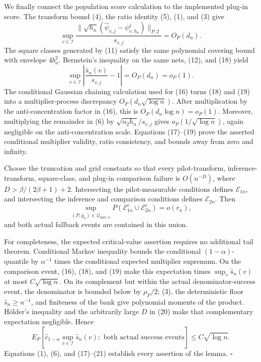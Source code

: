 We finally connect the population score calculation to the implemented plug-in score.  The transform bound (4), the ratio identity (5), (1), and (3) give
\[
 \sup_{v\in\mathcal I}
 \frac{\|\sqrt{h_n}(\widehat\psi_{v,j}-\psi^j_{v,h_n})\|_{P,2}}{s_{v,j}}
 =O_P(d_n). \tag{18}
\]
The square classes generated by (11) satisfy the same polynomial covering bound with envelope \(4b_n^2\).  Bernstein's inequality on the same nets, (12), and (18) yield
\[
 \sup_{v\in\mathcal I}\left|\frac{\widehat s_n(v)}{s_{v,j}}-1\right|=O_P(d_n)=o_P(1). \tag{19}
\]
The conditional Gaussian chaining calculation used for (16) turns (18) and (19) into a multiplier-process discrepancy \(O_P(d_n\sqrt{\log n})\).  After multiplication by the anti-concentration factor in (16), this is \(O_P(d_n\log n)=o_P(1)\).  Moreover, multiplying the remainder in (6) by \(\sqrt{n_2h_n}/s_{v,j}\) gives \(o_P(1/\sqrt{\log n})\), again negligible on the anti-concentration scale.  Equations (17)--(19) prove the asserted conditional multiplier validity, ratio consistency, and bounds away from zero and infinity.

Choose the truncation and grid constants so that every pilot-transform, inference-transform, square-class, and plug-in comparison failure is \(O(n^{-D})\), where \(D>\beta/(2\beta+1)+2\).  Intersecting the pilot-measurable conditions defines \(\mathcal E_{1n}\), and intersecting the inference and comparison conditions defines \(\mathcal E_{2n}\).  Then
\[
 \sup_{(P,\bar g_n)\in\mathcal Q_{\mathrm{spec},n}}
 P(\mathcal E_{1n}^c\cup\mathcal E_{2n}^c)=o(r_n), \tag{20}
\]
and both actual fallback events are contained in this union.

For completeness, the expected critical-value assertion requires no additional tail theorem.  Conditional Markov inequality bounds the conditional \((1-\alpha)\)-quantile by \(\alpha^{-1}\) times the conditional expected multiplier supremum.  On the comparison event, (16), (18), and (19) make this expectation times \(\sup_v\widehat s_n(v)\) at most \(C\sqrt{\log n}\).  On its complement but within the actual denominator-success event, the denominator is bounded below by \(\rho_F/2\); (3), the deterministic floor \(\widehat s_n\ge n^{-1}\), and finiteness of the bank give polynomial moments of the product.  H\"older's inequality and the arbitrarily large \(D\) in (20) make that complementary expectation negligible.  Hence
\[
 E_P\!\left[\widehat c_{1-\alpha}\sup_{v\in\mathcal I}\widehat s_n(v);
 \text{ both actual success events}\right]\le C\sqrt{\log n}. \tag{21}
\]
Equations (1), (6), and (17)--(21) establish every assertion of the lemma. \(\square\)